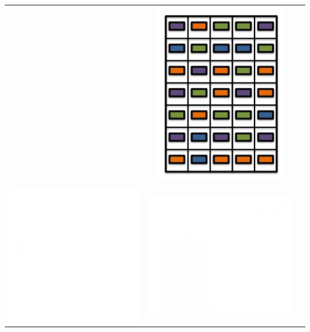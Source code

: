 \documentclass{beamer}
\begin{document}
\begin{frame}
\begin{center}
\begin{tabular}{ccc}
			&  \includegraphics*[scale=0.23]{figures/FD3.png}  \\
			\includegraphics*[scale=0.23]{figures/FD4_white.png}  
			& \includegraphics*[scale=0.23]{figures/FD5_white.png}  

\end{tabular}
\end{center}
\end{frame}
\end{document}

